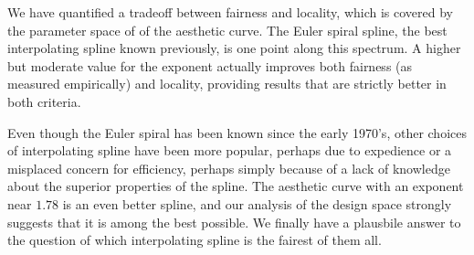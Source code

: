 \documentclass{article}
\begin{document}
We have quantified a tradeoff between fairness and locality, which is
covered by the parameter space of of the aesthetic curve. The Euler
spiral spline, the best interpolating spline known previously, is one
point along this spectrum. A higher but moderate value for the
exponent actually improves both fairness (as measured empirically) and
locality, providing results that are strictly better in both criteria.

Even though the Euler spiral has been known since the early 1970's,
other choices of interpolating spline have been more popular, perhaps
due to expedience or a misplaced concern for efficiency, perhaps
simply because of a lack of knowledge about the superior properties of
the spline. The aesthetic curve with an exponent near $1.78$ is an
even better spline, and our analysis of the design space strongly
suggests that it is among the best possible. We finally have a
plausbile answer to the question of which interpolating spline is the
fairest of them all.



\end{document}
